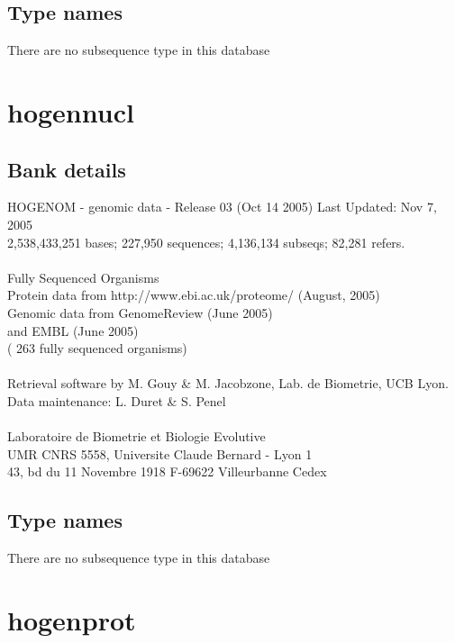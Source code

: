 \documentclass{article}
\begin{document}
\begin{Schunk}
\subsection{Type names}
There are no subsequence type in this database
\section{ hogennucl }
\subsection{Bank details}
HOGENOM - genomic data - Release 03 (Oct 14 2005) Last Updated: Nov  7, 2005\\
2,538,433,251 bases; 227,950 sequences; 4,136,134 subseqs; 82,281 refers.\\
\\
Fully Sequenced Organisms\\
Protein data from http://www.ebi.ac.uk/proteome/ (August, 2005)\\
Genomic data from GenomeReview  (June 2005)\\
and  EMBL (June 2005)\\
( 263 fully sequenced organisms)\\
\\
Retrieval software by M. Gouy \& M. Jacobzone, Lab. de Biometrie, UCB Lyon.\\
Data maintenance: L. Duret \& S. Penel\\
\\
Laboratoire de Biometrie et Biologie Evolutive\\
UMR CNRS 5558, Universite Claude Bernard - Lyon 1\\
43, bd du 11 Novembre 1918 F-69622 Villeurbanne Cedex\\


\subsection{Type names}
There are no subsequence type in this database
\section{ hogenprot }

\end{Schunk}
\end{document}

